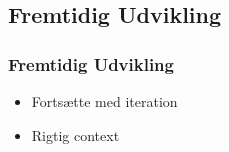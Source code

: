\subsection{Fremtidig Udvikling}

\begin{frame}
	\frametitle{Fremtidig Udvikling}
	\begin{itemize}
		\item Fortsætte med iteration
		\item Rigtig context
	\end{itemize}
\end{frame}

{\aauwavesbg
\begin{frame}
	\titlepage
\end{frame}}